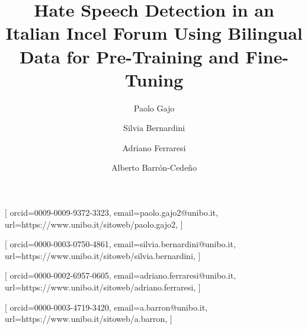 \documentclass[
twocolumn,
]{ceurart}
\begin{document}


\title{Hate Speech Detection in an Italian Incel Forum Using Bilingual Data for Pre-Training and Fine-Tuning}

\author[1]{Paolo Gajo}[%
orcid=0009-0009-9372-3323,
email=paolo.gajo2@unibo.it,
url=https://www.unibo.it/sitoweb/paolo.gajo2,
]

\author[1]{Silvia Bernardini}[%
orcid=0000-0003-0750-4861,
email=silvia.bernardini@unibo.it,
url=https://www.unibo.it/sitoweb/silvia.bernardini,
]

\author[1]{Adriano Ferraresi}[%
orcid=0000-0002-6957-0605,
email=adriano.ferraresi@unibo.it,
url=https://www.unibo.it/sitoweb/adriano.ferraresi,
]

\author[1]{Alberto Barr\'on-Cede\~no}[%
orcid=0000-0003-4719-3420,
email=a.barron@unibo.it,
url=https://www.unibo.it/sitoweb/a.barron,
]

\address[1]{Department of Interpreting and Translation, Universit\`a di Bologna, Corso della Repubblica, 136, 47121, Forl\`i, FC, Italy}
\end{document}

